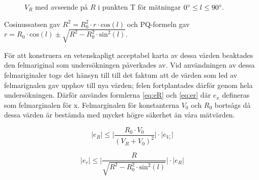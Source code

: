 \begin{figure}
    \centering
    \caption{$V_R$ med avseende på $R$ i punkten T för mätningar $0\degree \leq l \leq 90\degree.$}
    \label{fig:rotation_our}
\end{figure}



Cosinussatsen gav $R^2 = R_0^2 \cdot r \cdot \mathrm{cos}(l)$ och PQ-formeln gav \\$r = R_0 \cdot \mathrm{cos}(l) \pm \sqrt{R^2-R_0^2 \cdot \mathrm{sin}^2(l)}$.

För att konstruera en vetenskapligt acceptabel karta av dessa värden beaktades den felmariginal som undersökningen påverkades av. Vid användningen av dessa felmariginaler togs det hänsyn till till det faktum att de värden som led av felmarignalen gav upphov till nya värden; felen fortplantades därför genom hela undersökningen. Därför användes formlerna \ref{eq:eR} och \ref{eq:er}\autocite{wiki:fel} där $e_x$ defineras som felmarginalen för x. Felmarginalen för konstanterna $V_0$ och $R_0$ bortsågs då dessa värden är bestämda med mycket högre säkerhet än våra mätvärden.

\begin{equation} \label{eq:eR}
    \lvert e_R \rvert \leq \lvert \frac{R_0 \cdot V_0}{(V_R + V_0)^2} \rvert \cdot \lvert e_{V_r} \rvert
\end{equation}

\begin{equation} \label{eq:er}
    \lvert e_r \rvert \leq \lvert \frac{R}{\sqrt{R^2 - R_0^2 \cdot \mathrm{sin}^2(l)}} \rvert \cdot \lvert e_R \rvert
\end{equation}

